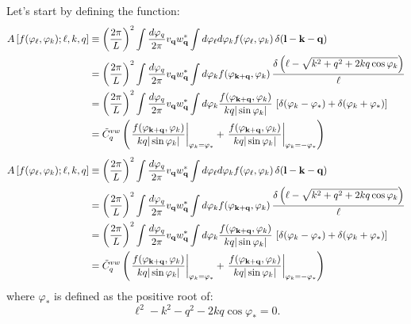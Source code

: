 \documentclass[a4paper,10pt]{article}
\begin{document}
    Let's start by defining the function:
    \begin{align}
      A\left[f(\varphi_\ell,\varphi_k);\ell,k,q\right]
      &\equiv\left(\frac{2\pi}{L}\right)^2\int\frac{d\varphi_q}{2\pi}v_{\bf q}w^*_{\bf q}\int d\varphi_\ell d\varphi_kf(\varphi_\ell,\varphi_k)\,\delta({\bf l}-{\bf k}-{\bf q})\\
      &= \left(\frac{2\pi}{L}\right)^2\int\frac{d\varphi_q}{2\pi}v_{\bf q}w^*_{\bf q} \int d\varphi_kf(\varphi_{{\bf k}+{\bf q}},\varphi_k)\,\frac{\delta\left(\ell-\sqrt{k^2+q^2+2kq\cos\varphi_k}\right)}{\ell}\\
      &= \left(\frac{2\pi}{L}\right)^2\int\frac{d\varphi_q}{2\pi}v_{\bf q}w^*_{\bf q} \int d\varphi_k\frac{f(\varphi_{{\bf k}+{\bf q}},\varphi_k)}{kq|\sin\varphi_k|}\,\left[\delta(\varphi_k-\varphi_*)+\delta(\varphi_k+\varphi_*)\right]\\
      &= \tilde{C}^{vw}_q\left(\left.\frac{f(\varphi_{{\bf k}+{\bf q}},\varphi_k)}{kq|\sin\varphi_k|}\right|_{\varphi_k=\varphi_*}+\left.\frac{f(\varphi_{{\bf k}+{\bf q}},\varphi_k)}{kq|\sin\varphi_k|}\right|_{\varphi_k=-\varphi_*}\right)
    \end{align}
    \begin{align}
      A\left[f(\varphi_\ell,\varphi_k);\ell,k,q\right]
      &\equiv\left(\frac{2\pi}{L}\right)^2\int\frac{d\varphi_q}{2\pi}v_{\bf q}w^*_{\bf q}\int d\varphi_\ell d\varphi_kf(\varphi_\ell,\varphi_k)\,\delta({\bf l}-{\bf k}-{\bf q})\\
      &= \left(\frac{2\pi}{L}\right)^2\int\frac{d\varphi_q}{2\pi}v_{\bf q}w^*_{\bf q} \int d\varphi_kf(\varphi_{{\bf k}+{\bf q}},\varphi_k)\,\frac{\delta\left(\ell-\sqrt{k^2+q^2+2kq\cos\varphi_k}\right)}{\ell}\\
      &= \left(\frac{2\pi}{L}\right)^2\int\frac{d\varphi_q}{2\pi}v_{\bf q}w^*_{\bf q} \int d\varphi_k\frac{f(\varphi_{{\bf k}+{\bf q}},\varphi_k)}{kq|\sin\varphi_k|}\,\left[\delta(\varphi_k-\varphi_*)+\delta(\varphi_k+\varphi_*)\right]\\
      &= \tilde{C}^{vw}_q\left(\left.\frac{f(\varphi_{{\bf k}+{\bf q}},\varphi_k)}{kq|\sin\varphi_k|}\right|_{\varphi_k=\varphi_*}+\left.\frac{f(\varphi_{{\bf k}+{\bf q}},\varphi_k)}{kq|\sin\varphi_k|}\right|_{\varphi_k=-\varphi_*}\right)
    \end{align}
    where $\varphi_*$ is defined as the positive root of:
    \begin{equation}
     \ell^2-k^2-q^2-2kq\cos\varphi_*=0.
    \end{equation}
\end{document}
